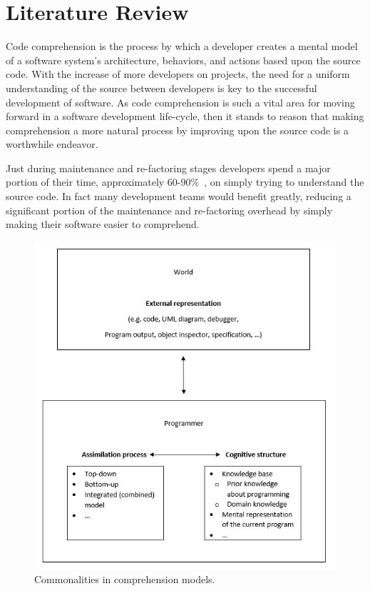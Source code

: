 \section{Literature Review}\label{sec-comprehend}
Code comprehension is the process by which a developer creates a 
mental model of a software system’s architecture, 
behaviors, and actions based upon the source code. With the increase of more developers on projects, the need
for a uniform understanding of the source between developers is key to the successful development of
software.
As code comprehension is such a vital area for moving forward in 
a software development life-cycle, then it stands to reason that 
making comprehension a more natural process by improving upon the source code is a worthwhile endeavor.

Just during maintenance and re-factoring stages developers spend a major 
portion of their time, approximately 60-90\%~\cite{ward_program_nodate}, on simply trying to understand the
source code. In fact many development teams would
benefit greatly, reducing a significant portion of the 
maintenance and re-factoring overhead by simply making their 
software easier to comprehend. 

\begin{figure}%
\centering
\includegraphics[scale=0.85]{images/ProgramCompModels}
\caption{Commonalities in comprehension models.} 
\label{fig:models}
\end{figure}

